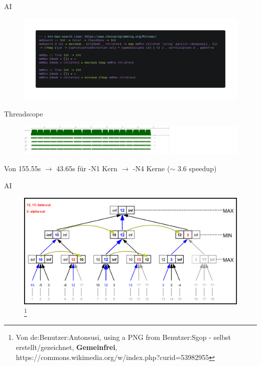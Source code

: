 \documentclass{beamer}
\begin{document}
\begin{frame}{AI}
\begin{figure}
\includegraphics[width=\linewidth]{parminmax.png}
\end{figure}
\end{frame}

\begin{frame}{Threadscope}

\begin{figure}
   \includegraphics[width=1.5\linewidth]{4cores_zoom}
\end{figure}

Von 155.55s $\rightarrow$ 43.65s f{\"u}r -N1 Kern $\rightarrow$ -N4 Kerne ($\sim$ 3.6 speedup)
\end{frame}

\begin{frame}{AI}
\begin{figure}
\includegraphics[width=\linewidth]{alphabetawiki.png}
\footnote{\tiny Von de:Benutzer:Antonsusi, using a PNG from Benutzer:Sgop - selbst erstellt/gezeichnet, \textbf{Gemeinfrei}, https://commons.wikimedia.org/w/index.php?curid=53982955}
\end{figure}
\end{frame}
\end{document}
